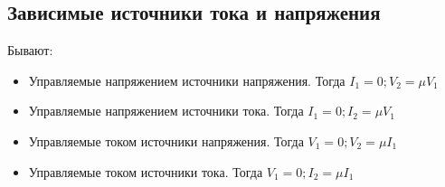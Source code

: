 \subsection{Зависимые источники тока и напряжения}

Бывают:
\begin{itemize}
\item
Управляемые напряжением источники напряжения. Тогда $I_1 = 0; V_2=\mu V_1$
\item
Управляемые напряжением источники тока. Тогда $I_1 = 0; I_2=\mu V_1$
\item
Управляемые током источники напряжения. Тогда $V_1 = 0; V_2=\mu I_1$
\item
Управляемые током источники тока. Тогда $V_1 = 0; I_2=\mu I_1$
\end{itemize}


\pagebreak
